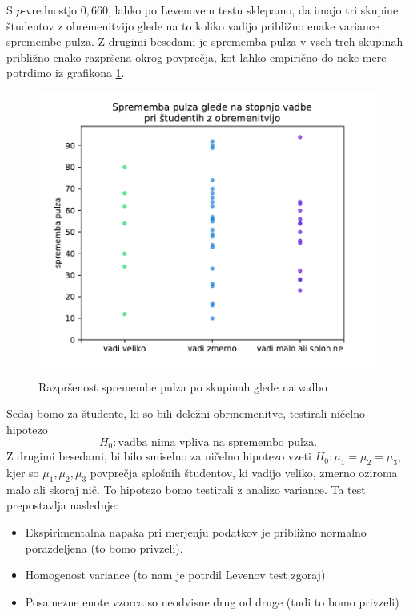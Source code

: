 \documentclass[a4paper,11pt]{article}
\begin{document}
S $p$-vrednostjo $0,660$, lahko po Levenovem testu sklepamo, da imajo tri skupine študentov z obremenitvijo glede na to koliko vadijo približno enake variance spremembe pulza. Z drugimi besedami je sprememba pulza v vseh treh skupinah približno enako razpršena okrog povprečja, kot lahko empirično do neke mere potrdimo iz grafikona \ref{Razprsenost spremembe pulza po skupinah glede na vadbo}.

\begin{figure}[h]
    \begin{center}
        \includegraphics[scale=0.7]{varianca_vadba.pdf}
        \caption{
            Razpršenost spremembe pulza po skupinah glede na vadbo
            }
        \label{Razprsenost spremembe pulza po skupinah glede na vadbo}
    \end{center}
\end{figure}


Sedaj bomo za študente, ki so bili deležni obrmemenitve, testirali ničelno hipotezo
\[
H_0: \text{vadba nima vpliva na spremembo pulza}.
\]
Z drugimi besedami, bi bilo smiselno za ničelno hipotezo vzeti $H_0 : \mu_1 = \mu_2 = \mu_3$, kjer so $\mu_1, \mu_2, \mu_3$ povprečja splošnih študentov, ki vadijo veliko, zmerno oziroma malo ali skoraj nič. To hipotezo bomo testirali z analizo variance. Ta test prepostavlja naslednje:
\begin{itemize}
    \item Ekspirimentalna napaka pri merjenju podatkov je približno normalno porazdeljena (to bomo privzeli).
    \item Homogenost variance (to nam je potrdil Levenov test zgoraj)
    \item Posamezne enote vzorca so neodvisne drug od druge (tudi to bomo privzeli) 
\end{itemize}
\end{document}
